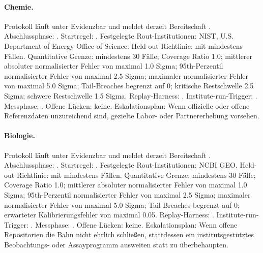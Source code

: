 \paragraph{Chemie.}
Protokoll  läuft unter Evidenzbar  und meldet derzeit Bereitschaft .
Abschlussphase: . Startregel: .
Festgelegte Rout-Institutionen: NIST, \allowbreak U.S. Department of Energy Office of Science.
Held-out-Richtlinie:  mit mindestens  Fällen.
Quantitative Grenze: mindestens 30 Fälle; Coverage Ratio 1.0; mittlerer absoluter normalisierter Fehler von maximal 1.0 Sigma; 95th-Perzentil normalisierter Fehler von maximal 2.5 Sigma; maximaler normalisierter Fehler von maximal 5.0 Sigma; Tail-Breaches begrenzt auf 0; kritische Restschwelle 2.5 Sigma; schwere Restschwelle 1.5 Sigma.
Replay-Harness: .
Institute-run-Trigger: . Messphase: .
Offene Lücken: keine.
Eskalationsplan: Wenn offizielle oder offene Referenzdaten unzureichend sind, gezielte Labor- oder Partnererhebung vorsehen.

\paragraph{Biologie.}
Protokoll  läuft unter Evidenzbar  und meldet derzeit Bereitschaft .
Abschlussphase: . Startregel: .
Festgelegte Rout-Institutionen: NCBI GEO.
Held-out-Richtlinie:  mit mindestens  Fällen.
Quantitative Grenze: mindestens 30 Fälle; Coverage Ratio 1.0; mittlerer absoluter normalisierter Fehler von maximal 1.0 Sigma; 95th-Perzentil normalisierter Fehler von maximal 2.5 Sigma; maximaler normalisierter Fehler von maximal 5.0 Sigma; Tail-Breaches begrenzt auf 0; erwarteter Kalibrierungsfehler von maximal 0.05.
Replay-Harness: .
Institute-run-Trigger: . Messphase: .
Offene Lücken: keine.
Eskalationsplan: Wenn offene Repositorien die Bahn nicht ehrlich schließen, stattdessen ein institutsgestütztes Beobachtungs- oder Assayprogramm ausweiten statt zu überbehaupten.

